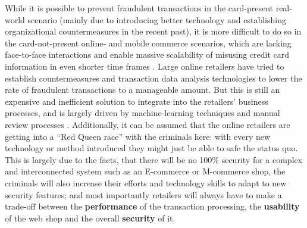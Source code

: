 While it is possible to prevent fraudulent transactions in the card-present real-world scenario (mainly due to introducing better technology and establishing organizational countermeasures in the recent past), it is more difficult to do so in the card-not-present online- and mobile commerce scenarios, which are lacking face-to-face interactions and enable massive scalability of misusing credit card information in even shorter time frames \citep{Lewis2015}. Large online retailers have tried to establish countermeasures and transaction data analysis technologies to lower the rate of fraudulent transactions to a manageable amount. But this is still an expensive and inefficient solution to integrate into the retailers’ business processes, and is largely driven by machine-learning techniques and manual review processes \citep{Brachmann2015}. Additionally, it can be assumed that the online retailers are getting into a ``Red Queen race'' with the criminals here: with every new technology or method introduced they might just be able to safe the status quo. This is largely due to the facts, that there will be no 100\% security for a complex and interconnected system such as an E-commerce or M-commerce shop, the criminals will also increase their efforts and technology skills to adapt to new security features; and most importantly retailers will always have to make a trade-off between the \textbf{performance} of the transaction processing, the \textbf{usability} of the web shop and the overall \textbf{security} of it.


